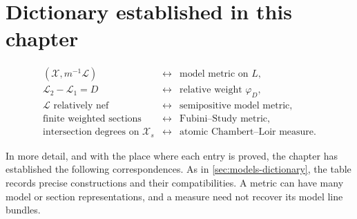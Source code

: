 \section{Dictionary established in this chapter}
\label{sec:metrics-dictionary}

\[
\begin{array}{ccl}
(\mathcal X,m^{-1}\mathcal L)
 &\longleftrightarrow& \text{model metric on }L,\\[1mm]
\mathcal L_2-\mathcal L_1=D
 &\longleftrightarrow& \text{relative weight }\varphi_D,\\[1mm]
\mathcal L\text{ relatively nef}
 &\longleftrightarrow& \text{semipositive model metric},\\[1mm]
\text{finite weighted sections}
 &\longleftrightarrow& \text{Fubini--Study metric},\\[1mm]
\text{intersection degrees on }\mathcal X_s
 &\longleftrightarrow& \text{atomic Chambert--Loir measure}.
\end{array}
\]

In more detail, and with the place where each entry is proved, the chapter
has established the following correspondences. As in
\cref{sec:models-dictionary}, the table records precise constructions
and their compatibilities. A metric can have many model or section
representations, and a measure need not recover its model line bundles.

